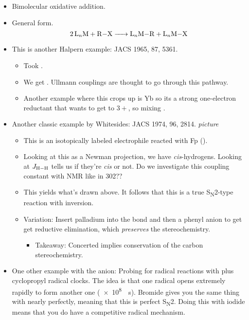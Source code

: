 \documentclass[../notes.tex]{subfiles}
\begin{document}
\begin{itemize}
    \item Bimolecular oxidative addition.
    \item General form.
    \begin{equation*}
        \ce{2L_nM + R-X -> L_nM-R + L_nM-X}
    \end{equation*}
    \item This is another Halpern example: JACS 1965, 87, 5361.
    \begin{itemize}
        \item Took .
        \item We get . Ullmann couplings are thought to go through this pathway.
        \item Another example where this crops up is  Yb so its a strong one-electron reductant that wants to get to $3+$, so mixing .
    \end{itemize}
    \item Another classic example by Whitesides: JACS 1974, 96, 2814.
    \emph{picture}
    \begin{itemize}
        \item This is an isotopically labeled electrophile reacted with Fp ().
        \item Looking at this as a Newman projection, we have \emph{cis}-hydrogens. Looking at $J_{\ce{H-H}}$ tells us if they're \emph{cis} or not. Do we investigate this coupling constant with NMR like in 302??
        \item This yields what's drawn above. It follows that this is a true S\textsubscript{N}2-type reaction with inversion.
        \item Variation: Insert palladium into the  bond and then a phenyl anion to get get reductive elimination, which \emph{preserves} the stereochemistry.
        \begin{itemize}
            \item Takeaway: Concerted implies conservation of the carbon stereochemistry.
        \end{itemize}
    \end{itemize}
    \item One other example with the  anion: Probing for radical reactions with  plus cyclopropyl radical clocks. The idea is that one radical opens extremely rapidly to form another one (\SI{e8}{\per\second}). Bromide gives you the same thing with  nearly perfectly, meaning that this is perfect S\textsubscript{N}2. Doing this with iodide means that you do have a competitive radical mechanism.

\end{itemize}
\end{document}

